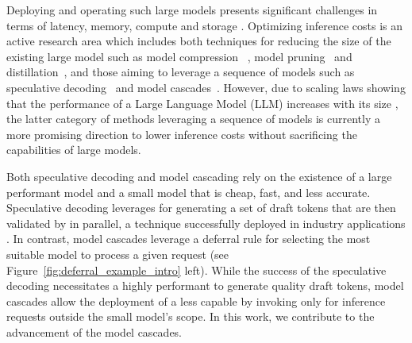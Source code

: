 Deploying and operating such large models presents significant challenges in terms of latency, memory, compute and storage \citep{MLSYS2023_c4be71ab}. Optimizing inference costs is an active research area which includes both techniques for reducing the size of the existing large model such as model compression ~\citep{hoefler2021sparsity}, model pruning~\citep{ma2023llmpruner, pruning_survey} and distillation~\citep{knowledgedistilation_survey}, and those aiming to leverage a sequence of models such as speculative decoding~\citep{leviathan2023fast} and model cascades~\citep{dohan2022language}. However, due to scaling laws showing that the performance of a Large Language Model (LLM) increases with its size \citep{kaplan2020scaling}, the latter category of methods leveraging a sequence of models is currently a more promising direction to lower inference costs without sacrificing the capabilities of large models. %


Both speculative decoding and model cascading  rely on the existence of a large performant model \textbf{\bigmodel} and a small model \textbf{\smallmodel} that is cheap, fast, and less accurate. Speculative decoding leverages \textbf{\smallmodel} for generating a set of draft tokens that are then validated by \textbf{\bigmodel} in parallel, a technique successfully deployed in industry applications \citep{blogpost}. In contrast, model cascades leverage a deferral rule for selecting the most suitable model to process a given request (see Figure~\ref{fig:deferral_example_intro} left). While the success of the speculative decoding necessitates a highly performant \textbf{\smallmodel} to generate quality draft tokens, model cascades allow the deployment of a less capable \textbf{\smallmodel} by invoking \textbf{\bigmodel} only for inference requests outside the small model's scope. In this work, we contribute to the advancement of the model cascades. %

